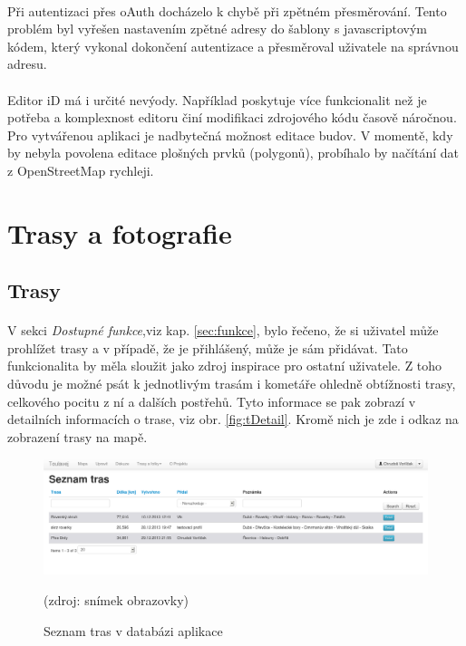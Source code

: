 \documentclass[11pt,a4paper,titlepage,oneside]{book}
\begin{document}
				\paragraph{} Při autentizaci přes oAuth docházelo k chybě při zpětném přesměrování. Tento problém byl vyřešen nastavením zpětné adresy do šablony s javascriptovým kódem, který vykonal dokončení autentizace a přesměroval uživatele na správnou adresu.

				\paragraph{} Editor iD má i určité nevýody. Například poskytuje více funkcionalit než je potřeba a komplexnost editoru činí modifikaci zdrojového kódu časově náročnou. Pro vytvářenou aplikaci je nadbytečná možnost editace budov. V momentě, kdy by nebyla povolena editace plošných prvků (polygonů), probíhalo by načítání dat z OpenStreetMap rychleji. 



		\section{Trasy a fotografie}
			\subsection{Trasy}
			\paragraph{} V sekci \textit{Dostupné funkce},viz kap. \ref{sec:funkce}, bylo řečeno, že si uživatel může prohlížet trasy a v případě, že je přihlášený, může je sám přidávat. Tato funkcionalita by měla sloužit jako zdroj inspirace pro ostatní uživatele. Z toho důvodu je možné psát k jednotlivým trasám i kometáře ohledně obtížnosti trasy, celkového pocitu z ní a dalších postřehů. Tyto informace se pak zobrazí v detailních informacích o trase, viz obr. \ref{fig:tDetail}. Kromě nich je zde i odkaz na zobrazení trasy na mapě.
		\begin{figure}[!h]
			\begin{center}
				\includegraphics[width=12cm]{obrazky/toulavej/trackDefault.png}
				\caption{Seznam tras v databázi aplikace }
				\label{fig:tDefault}
				(zdroj: snímek obrazovky)
			\end{center}
		\end{figure}	
\end{document}
